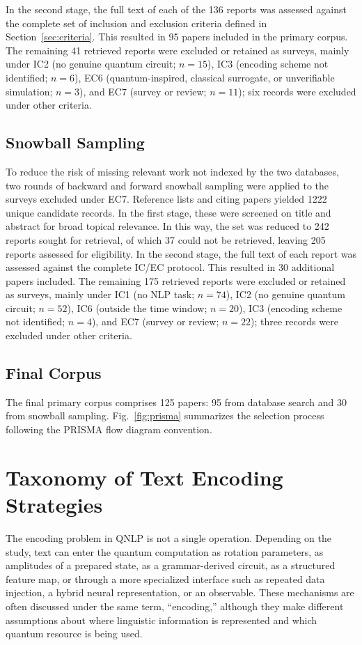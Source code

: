 \documentclass{ieeeaccess}
\begin{document}
In the second stage, the full text of each of the 136 reports was assessed against the complete set of inclusion and exclusion criteria defined in Section~\ref{sec:criteria}. This resulted in 95 papers included in the primary corpus. The remaining 41 retrieved reports were excluded or retained as surveys, mainly under IC2 (no genuine quantum circuit; $n = 15$), IC3 (encoding scheme not identified; $n = 6$), EC6 (quantum-inspired, classical surrogate, or unverifiable simulation; $n = 3$), and EC7 (survey or review; $n = 11$); six records were excluded under other criteria.

\subsection{Snowball Sampling}
To reduce the risk of missing relevant work not indexed by the two databases, two rounds of backward and forward snowball sampling \cite{wohlin2014guidelines} were applied to the surveys excluded under EC7. Reference lists and citing papers yielded 1222 unique candidate records. In the first stage, these were screened on title and abstract for broad topical relevance. In this way, the set was reduced to 242 reports sought for retrieval, of which 37 could not be retrieved, leaving 205 reports assessed for eligibility. In the second stage, the full text of each report was assessed against the complete IC/EC protocol. This resulted in 30 additional papers included. The remaining 175 retrieved reports were excluded or retained as surveys, mainly under IC1 (no NLP task; $n = 74$), IC2 (no genuine quantum circuit; $n = 52$), IC6 (outside the time window; $n = 20$), IC3 (encoding scheme not identified; $n = 4$), and EC7 (survey or review; $n = 22$); three records were excluded under other criteria.

\subsection{Final Corpus}
The final primary corpus comprises 125 papers: 95 from database search and 30 from snowball sampling. Fig.~\ref{fig:prisma} summarizes the selection process following the PRISMA flow diagram convention.

\section{Taxonomy of Text Encoding Strategies}
\label{sec:taxonomy}

The encoding problem in QNLP is not a single operation. Depending on the study, text can enter the quantum computation as rotation parameters, as amplitudes of a prepared state, as a grammar-derived circuit, as a structured feature map, or through a more specialized interface such as repeated data injection, a hybrid neural representation, or an observable. These mechanisms are often discussed under the same term, ``encoding,'' although they make different assumptions about where linguistic information is represented and which quantum resource is being used.
\end{document}
